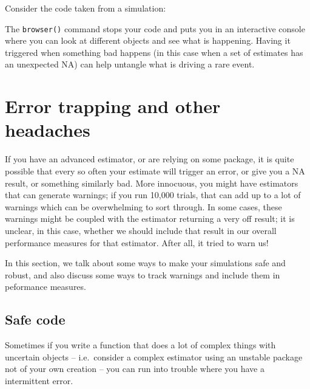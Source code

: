 \documentclass[
]{book}
\newenvironment{Shaded}{\begin{snugshade}}{\end{snugshade}}
\newcommand{\ControlFlowTok}[1]{\textcolor[rgb]{0.13,0.29,0.53}{\textbf{#1}}}
\newcommand{\FunctionTok}[1]{\textcolor[rgb]{0.00,0.00,0.00}{#1}}
\newcommand{\NormalTok}[1]{#1}
\newcommand{\SpecialCharTok}[1]{\textcolor[rgb]{0.00,0.00,0.00}{#1}}
\begin{document}
Consider the code taken from a simulation:

\begin{Shaded}
\end{Shaded}

The \texttt{browser()} command stops your code and puts you in an interactive console where you can look at different objects and see what is happening.
Having it triggered when something bad happens (in this case when a set of estimates has an unexpected NA) can help untangle what is driving a rare event.

\hypertarget{error-trapping-and-other-headaches}{%
\chapter{Error trapping and other headaches}\label{error-trapping-and-other-headaches}}

If you have an advanced estimator, or are relying on some package, it is quite possible that every so often your estimate will trigger an error, or give you a NA result, or something similarly bad.
More innocuous, you might have estimators that can generate warnings; if you run 10,000 trials, that can add up to a lot of warnings which can be overwhelming to sort through.
In some cases, these warnings might be coupled with the estimator returning a very off result; it is unclear, in this case, whether we should include that result in our overall performance measures for that estimator.
After all, it tried to warn us!

In this section, we talk about some ways to make your simulations safe and robust, and also discuss some ways to track warnings and include them in peformance measures.

\hypertarget{safe_code}{%
\section{Safe code}\label{safe_code}}

Sometimes if you write a function that does a lot of complex things with
uncertain objects -- i.e.~consider a complex estimator using an unstable package not of your own creation -- you can run into trouble where you have a intermittent error.
\end{document}
